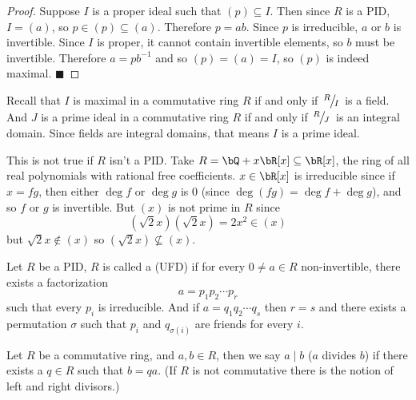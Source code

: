\documentclass[10pt]{article}
\def\divides{{\mid}}
\def\qed{\hskip1cm\hbox{}\hfill$\blacksquare$}
\begin{document}
\begin{proof}

    Suppose $I$ is a proper ideal such that $(p)\subseteq I$.
    Then since $R$ is a PID, $I=(a)$, so $p\in(p)\subseteq(a)$.
    Therefore $p=ab$.
    Since $p$ is irreducible, $a$ or $b$ is invertible.
    Since $I$ is proper, it cannot contain invertible elements, so $b$ must be invertible.
    Therefore $a=pb^{-1}$ and so $(p)=(a)=I$, so $(p)$ is indeed maximal.
    \qed

\end{proof}

Recall that $I$ is maximal in a commutative ring $R$ if and only if $\slfrac RI$ is a field.
And $J$ is a prime ideal in a commutative ring $R$ if and only if $\slfrac RJ$ is an integral domain.
Since fields are integral domains, that means $I$ is a prime ideal.

\begin{exam*}

    This is not true if $R$ isn't a PID.
    Take $R=\bQ+x\bR[x]\subseteq\bR[x]$, the ring of all real polynomials with rational free coefficients.
    $x\in\bR[x]$ is irreducible since if $x=fg$, then either $\deg f$ or $\deg g$ is $0$ (since $\deg(fg)=\deg f+\deg g$), and so $f$ or $g$ is invertible.
    But $(x)$ is not prime in $R$ since
    \[ (\sqrt 2x)(\sqrt2x) = 2x^2 \in (x) \]
    but $\sqrt2x\notin(x)$ so $(\sqrt2x)\nsubseteq(x)$.

\end{exam*}

\begin{defn*}

    Let $R$ be a PID, $R$ is called a  (UFD) if for every $0\neq a\in R$ non-invertible, there exists a factorization
    \[ a = p_1p_2\cdots p_r \]
    such that every $p_i$ is irreducible.
    And if $a=q_1q_2\cdots q_s$ then $r=s$ and there exists a permutation $\sigma$ such that $p_i$ and $q_{\sigma(i)}$ are friends for every $i$.

\end{defn*}

\begin{defn*}

    Let $R$ be a commutative ring, and $a,b\in R$, then we say $a\divides b$ ($a$ divides $b$) if there exists a $q\in R$ such that $b=qa$.
    (If $R$ is not commutative there is the notion of left and right divisors.)

\end{defn*}
\end{document}
